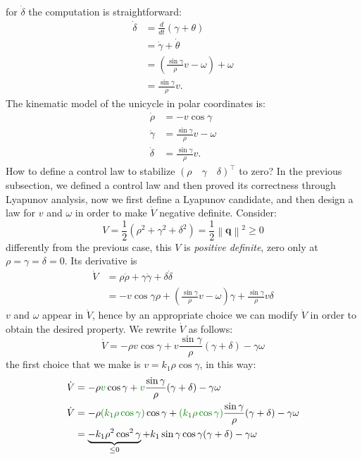 \documentclass[10pt, a4paper]{report}
\newcommand{\q}{{\mathbf q}}
\begin{document}
for $\dot\delta$ the computation is straightforward:
\begin{align}
\dot{\delta} &= \frac{d}{dt}(\gamma + \theta) \\
&= \dot{\gamma} + \dot{\theta} \\
&= \left( \frac{\sin\gamma}{\rho} v - \omega \right) + \omega \\
&= \frac{\sin\gamma}{\rho} v.
\end{align}
The kinematic model of the unicycle in polar coordinates is:\begin{align}
\dot{\rho} &= -v\cos\gamma \\
\dot{\gamma} &= \frac{\sin\gamma}{\rho} v - \omega \\
\dot{\delta} &= \frac{\sin\gamma}{\rho} v.\label{dot_delta}
\end{align}
How to define a control law to stabilize $(\rho\quad\gamma\quad\delta)^\top$ to zero? In the previous subsection, we defined a control law and then proved its correctness through Lyapunov analysis, now we first define a Lyapunov candidate, and then design a law for $v$ and $\omega$ in order to make $\dot V$ negative definite. Consider:\begin{equation}
    V=\frac{1}{2}(\rho^2+\gamma^2+\delta^2)=\frac{1}{2}\left\|\q\right\|^2\ge 0
\end{equation}
differently from the previous case, this $V$ is \textit{positive definite}, zero only at $\rho=\gamma=\delta=0$. Its derivative is\begin{align}
    \dot V &= \rho\dot\rho+\gamma\dot\gamma+\delta\dot\delta \\
    &= -v\cos\gamma\rho + \left(\frac{\sin\gamma}{\rho} v - \omega\right)\gamma + \frac{\sin\gamma}{\rho} v\delta
\end{align}
$v$ and $\omega$ appear in $\dot V$, hence by an appropriate choice we can modify $\dot V$ in order to obtain the desired property. We rewrite $\dot V$ as follows:\begin{equation}
    \dot V=-\rho v\cos\gamma+v\frac{\sin\gamma}{\rho}(\gamma+\delta)-\gamma\omega
\end{equation}
the first choice that we make is $v=k_1\rho\cos\gamma$, in this way:\begin{align}
    \dot V&=-\rho  \greenText{v}\cos\gamma+ \greenText{v}\frac{\sin\gamma}{\rho}(\gamma+\delta)-\gamma\omega\\
    \dot V&=-\rho \greenText{(k_1\rho\cos\gamma)}\cos\gamma+\greenText{(k_1\rho\cos\gamma)}\frac{\sin\gamma}{\rho}(\gamma+\delta)-\gamma\omega\\
    &=\underbrace{-k_1\rho^2\cos^2\gamma}_{\le 0}+k_1\sin\gamma\cos\gamma(\gamma+\delta)-\gamma\omega
\end{align}
\end{document}
